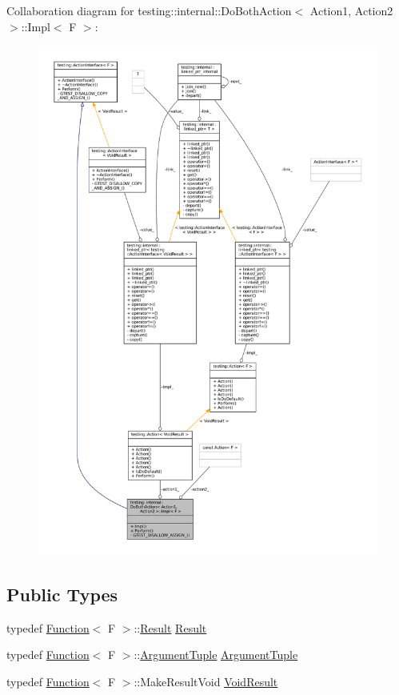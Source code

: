 Collaboration diagram for testing\+:\+:internal\+:\+:Do\+Both\+Action$<$ Action1, Action2 $>$\+:\+:Impl$<$ F $>$\+:
\nopagebreak
\begin{figure}[H]
\begin{center}
\leavevmode
\includegraphics[width=350pt]{classtesting_1_1internal_1_1DoBothAction_1_1Impl__coll__graph}
\end{center}
\end{figure}
\subsection*{Public Types}
\begin{DoxyCompactItemize}
\item 
typedef \hyperlink{structtesting_1_1internal_1_1Function}{Function}$<$ F $>$\+::\hyperlink{classtesting_1_1ActionInterface_a7477de2fe3e4e01c59db698203acaee7}{Result} \hyperlink{classtesting_1_1internal_1_1DoBothAction_1_1Impl_a90f9878e3c1db37a688b6e0c4c29c17d}{Result}
\item 
typedef \hyperlink{structtesting_1_1internal_1_1Function}{Function}$<$ F $>$\+::\hyperlink{classtesting_1_1ActionInterface_af72720d864da4d606629e83edc003511}{Argument\+Tuple} \hyperlink{classtesting_1_1internal_1_1DoBothAction_1_1Impl_a2cd808bf132e28d3df7d59d23c19f273}{Argument\+Tuple}
\item 
typedef \hyperlink{structtesting_1_1internal_1_1Function}{Function}$<$ F $>$\+::Make\+Result\+Void \hyperlink{classtesting_1_1internal_1_1DoBothAction_1_1Impl_a83909f0d1addcd1207ff45b128f33802}{Void\+Result}
\end{DoxyCompactItemize}
